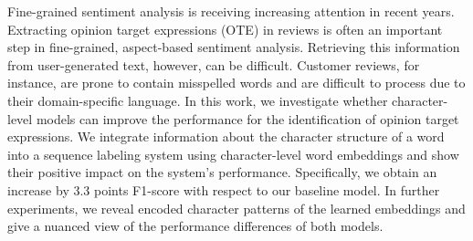Fine-grained sentiment analysis is receiving increasing attention in recent years. Extracting opinion target expressions (OTE) in reviews is often an important step in fine-grained, aspect-based sentiment analysis. Retrieving this information from user-generated text, however, can be difficult. Customer reviews, for instance, are prone to contain misspelled words and are difficult to process due to their domain-specific language. In this work, we investigate whether character-level models can improve the performance for the identification of opinion target expressions. We integrate information about the character structure of a word into a sequence labeling system using character-level word embeddings and show their positive impact on the system's performance. Specifically, we obtain an increase by 3.3 points F1-score with respect to our baseline model. In further experiments, we reveal encoded character patterns of the learned embeddings and give a nuanced view of the performance differences of both models.
